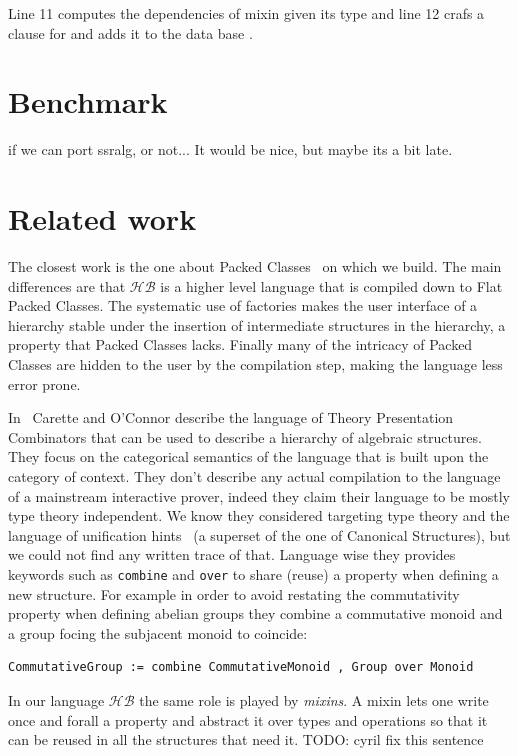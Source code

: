 \documentclass[a4paper,UKenglish,cleveref, autoref]{lipics-v2019}
\newcommand{\HB}{\ensuremath{\mathcal{HB}}}
\begin{document}
{{Line 11 computes the dependencies of mixin  given
its type and line 12 crafs a clause for  and
adds it to the data base .

\section{Benchmark}
if we can port ssralg, or not... It would be nice, but maybe its a bit late.

\section{Related work}
The closest work is the one about Packed Classes~\cite{DBLP:conf/tphol/GarillotGMR09} on which we
build. The main differences are that \HB{} is a higher level language
that is compiled down to Flat Packed Classes. The systematic use of
factories makes the user interface of a hierarchy stable under the insertion of
intermediate structures in the hierarchy, a property that Packed Classes lacks.
Finally many of the intricacy of Packed Classes are hidden to the user by
the compilation step, making the language less error prone.

In~\cite{CaretteCombinators} Carette and O'Connor describe the language of
Theory Presentation Combinators that can be used to describe a hierarchy of
algebraic structures.
They focus on the categorical semantics of the language that is built upon
the category of context.
They don't describe any actual compilation to the language of a mainstream
interactive prover, indeed they claim their language to be mostly type theory
independent. We know they considered targeting type theory and the language
of unification hints~\cite{10.1007/978-3-642-03359-9_8}
(a superset of the one of Canonical Structures),
but we could not find any written trace of that. Language wise they provides
keywords such as \verb+combine+ and \verb+over+ to share (reuse) a property
when defining a new structure. For example in order to avoid restating
the commutativity property when defining abelian groups they combine
a commutative monoid and a group focing the subjacent monoid to coincide:
\begin{verbatim}
CommutativeGroup := combine CommutativeMonoid , Group over Monoid
\end{verbatim}
In our language \HB{} the same role is played by \emph{mixins}.
A mixin lets one write once and forall a property and abstract it over types
and operations so that it can be reused in all the structures that need it.
TODO: cyril fix this sentence

}}
\end{document}
